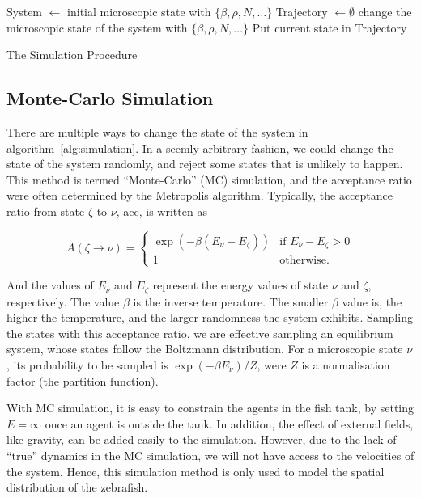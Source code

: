 \documentclass[11pt,twoside]{report}
\begin{document}
\begin{algorithm}
	System $\gets$ initial microscopic state with $\{ \beta, \rho, N, \dots \}$\;
	Trajectory $\gets \emptyset$\;
	 {
		change the microscopic state of the system with $\{ \beta, \rho, N, \dots \}$\;
		Put current state in Trajectory\;
	}
\caption{The Simulation Procedure}
\label{alg:simulation}
\end{algorithm}

\subsection{Monte-Carlo Simulation}

There are multiple ways to change the state of the system in algorithm~\ref{alg:simulation}. In a seemly arbitrary fashion, we could change the state of the system randomly, and reject some states that is unlikely to happen. This method is termed ``Monte-Carlo'' (MC) simulation, and the acceptance ratio were often determined by the Metropolis algorithm.
Typically, the acceptance ratio from state $\zeta$ to $\nu$, \gls{acc}, is written as

\[
	A(\zeta \rightarrow \nu) = \left\{
		\begin{array}{ll}
			\exp\left(-\beta(E_\nu - E_\zeta)\right)
			& \mbox{if $E_\nu - E_\zeta > 0$}\\
			1 & \mbox{otherwise.}
		\end{array}
	\right.
\]

\noindent And the values of $E_\nu$ and $E_\zeta$ represent the energy values of state $\nu$ and $\zeta$, respectively. The value $\beta$ is the inverse temperature. The smaller $\beta$ value is, the higher the temperature, and the larger randomness the system exhibits. Sampling the states with this acceptance ratio, we are effective sampling an equilibrium system, whose states follow the Boltzmann distribution. For a microscopic state $\nu$, its probability to be sampled is $\exp(-\beta E_\nu) / Z$, were $Z$ is a normalisation factor (the partition function).

With MC simulation, it is easy to constrain the agents in the fish tank, by setting $E = \infty$ once an agent is outside the tank. In addition, the effect of external fields, like gravity, can be added easily to the simulation. However, due to the lack of ``true'' dynamics in the MC simulation, we will not have access to the velocities of the system. Hence, this simulation method is only used to model the spatial distribution of the zebrafish.
\end{document}
